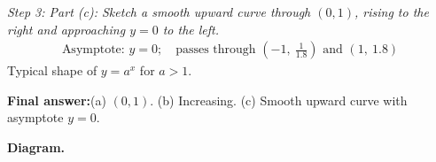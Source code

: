 \documentclass[11pt]{article}
\begin{document}
\textit{Step 3: Part (c): Sketch a smooth upward curve through \( (0,1) \), rising to the right and approaching \( y=0 \) to the left.}
\[\begin{gathered}
\text{Asymptote: } y = 0; \quad \text{passes through } (-1,\ \tfrac{1}{1.8}) \text{ and } (1,\ 1.8)
\end{gathered}\]
Typical shape of \( y = a^x \) for \( a > 1 \).

\begin{answerbox}
\textbf{Final answer:}\quad (a) \(\displaystyle  (0, 1) \). (b) Increasing. (c) Smooth upward curve with asymptote \(\displaystyle  y = 0 \).
\end{answerbox}
\textbf{Diagram.}

\begin{center}
\end{center}
\end{document}
